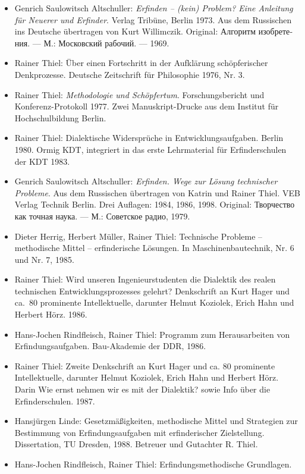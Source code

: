 \documentclass[11pt,a4paper]{article}
\begin{document}
\begin{itemize}
\item Genrich Saulowitsch Altschuller: \emph{Erfinden – (kein) Problem? Eine
  Anleitung für Neuerer und Erfinder}. Verlag Tribüne, Berlin 1973. Aus dem
  Russischen ins Deutsche übertragen von Kurt Willimczik. Original:
  \foreignlanguage{russian}{Алгоритм изобретения. — М.: Московский рабочий. —
    1969.}
\item Rainer Thiel: Über einen Fortschritt in der Aufklärung schöpferischer
  Denkprozesse. Deutsche Zeitschrift für Philosophie 1976, Nr. 3.
\item Rainer Thiel: \emph{Methodologie und Schöpfertum}. Forschungsbericht und
  Konferenz-Protokoll 1977. Zwei Manuskript-Drucke aus dem Institut für
  Hochschulbildung Berlin.
\item Rainer Thiel: Dialektische Widersprüche in Entwicklungsaufgaben. Berlin
  1980.  Ormig KDT, integriert in das erste Lehrmaterial für Erfinderschulen
  der KDT 1983.
\item Genrich Saulowitsch Altschuller: \emph{Erfinden. Wege zur Lösung
  technischer Probleme}. Aus dem Russischen übertragen von Katrin und Rainer
  Thiel. VEB Verlag Technik Berlin. Drei Auflagen: 1984, 1986, 1998. Original:
  \foreignlanguage{russian}{Творчество как точная наука. — М.: Советское
    радио, 1979.}
\item Dieter Herrig, Herbert Müller, Rainer Thiel: Technische Probleme –
  methodische Mittel – erfinderische Lösungen. In Maschinenbautechnik, Nr. 6
  und Nr. 7, 1985.
\item Rainer Thiel: Wird unseren Ingenieurstudenten die Dialektik des realen
  technischen Entwicklungsprozesses gelehrt? Denkschrift an Kurt Hager und
  ca.\ 80 prominente Intellektuelle, darunter Helmut Koziolek, Erich Hahn und
  Herbert Hörz. 1986.
\item Hans-Jochen Rindfleisch, Rainer Thiel: Programm zum Herausarbeiten von
  Erfindungsaufgaben. Bau-Akademie der DDR, 1986.
\item Rainer Thiel: Zweite Denkschrift an Kurt Hager und ca. 80 prominente
  Intellektuelle, darunter Helmut Koziolek, Erich Hahn und Herbert Hörz. Darin
  {\glqq}Wie ernst nehmen wir es mit der Dialektik?{\grqq} sowie Info über die
  Erfinderschulen. 1987.
\item Hansjürgen Linde: Gesetzmäßigkeiten, methodische Mittel und Strategien
  zur Bestimmung von Erfindungsaufgaben mit erfinderischer Zielstellung.
  Dissertation, TU Dresden, 1988. Betreuer und Gutachter R. Thiel.
\item Hans-Jochen Rindfleisch, Rainer Thiel: Erfindungsmethodische Grundlagen.

\end{itemize}
\end{document}
